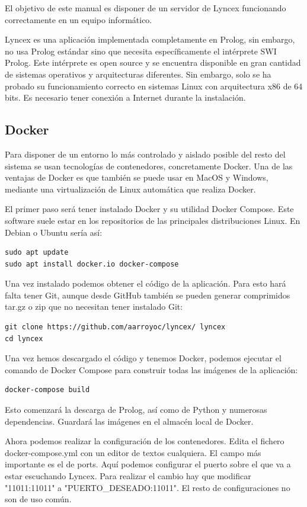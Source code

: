 \documentclass[12pt]{report} %
\begin{document}
El objetivo de este manual es disponer de un servidor de Lyncex funcionando correctamente en un equipo informático.

Lyncex es una aplicación implementada completamente en Prolog, sin embargo, no usa Prolog estándar sino que necesita específicamente el intérprete SWI Prolog. Este intérprete es open source y se encuentra disponible en gran cantidad de sistemas operativos y arquitecturas diferentes. Sin embargo, solo se ha probado su funcionamiento correcto en sistemas Linux con arquitectura x86 de 64 bits. Es necesario tener conexión a Internet durante la instalación.

\subsection{Docker}

Para disponer de un entorno lo más controlado y aislado posible del resto del sistema se usan tecnologías de contenedores, concretamente Docker. Una de las ventajas de Docker es que también se puede usar en MacOS y Windows, mediante una virtualización de Linux automática que realiza Docker.

El primer paso será tener instalado Docker y su utilidad Docker Compose. Este software suele estar en los repositorios de las principales distribuciones Linux. En Debian o Ubuntu sería así:
\begin{verbatim}
sudo apt update
sudo apt install docker.io docker-compose
\end{verbatim}

Una vez instalado podemos obtener el código de la aplicación. Para esto hará falta tener Git, aunque desde GitHub también se pueden generar comprimidos tar.gz o zip que no necesitan tener instalado Git:
\begin{verbatim}
git clone https://github.com/aarroyoc/lyncex/ lyncex
cd lyncex
\end{verbatim}

Una vez hemos descargado el código y tenemos Docker, podemos ejecutar el comando de Docker Compose para construir todas las imágenes de la aplicación:
\begin{verbatim}
docker-compose build
\end{verbatim}

Esto comenzará la descarga de Prolog, así como de Python y numerosas dependencias. Guardará las imágenes en el almacén local de Docker. 

Ahora podemos realizar la configuración de los contenedores. Edita el fichero docker-compose.yml con un editor de textos cualquiera. El campo más importante es el de ports. Aquí podemos configurar el puerto sobre el que va a estar escuchando Lyncex. Para realizar el cambio hay que modificar "11011:11011" a "PUERTO\_DESEADO:11011". El resto de configuraciones no son de uso común.
\end{document}
